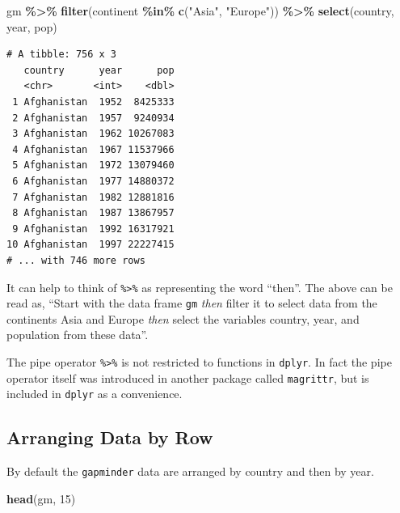\documentclass[
]{krantz}
\makeatletter
\newenvironment{Shaded}{\begin{snugshade}}{\end{snugshade}}
\newcommand{\DecValTok}[1]{\textcolor[rgb]{0.06,0.06,0.06}{#1}}
\newcommand{\KeywordTok}[1]{\textcolor[rgb]{0.27,0.27,0.27}{\textbf{#1}}}
\newcommand{\NormalTok}[1]{#1}
\newcommand{\OperatorTok}[1]{\textcolor[rgb]{0.43,0.43,0.43}{\textbf{#1}}}
\newcommand{\StringTok}[1]{\textcolor[rgb]{0.5,0.5,0.5}{#1}}
\newenvironment{kframe}{%
\medskip{}
\setlength{\fboxsep}{.8em}
 \def\at@end@of@kframe{}%
 \ifinner\ifhmode%
  \def\at@end@of@kframe{\end{minipage}}%
  \begin{minipage}{\columnwidth}%
 \fi\fi%
 \def\FrameCommand##1{\hskip\@totalleftmargin \hskip-\fboxsep
 \colorbox{shadecolor}{##1}\hskip-\fboxsep
     \hskip-\linewidth \hskip-\@totalleftmargin \hskip\columnwidth}%
 \MakeFramed {\advance\hsize-\width
   \@totalleftmargin\z@ \linewidth\hsize
   \@setminipage}}%
 {\par\unskip\endMakeFramed%
 \at@end@of@kframe}
\renewenvironment{Shaded}{\begin{kframe}}{\end{kframe}}
\makeatother
\begin{document}
\begin{Shaded}
\begin{Highlighting}[]
\NormalTok{gm }\OperatorTok{\%\textgreater{}\%}\StringTok{ }
\StringTok{  }\KeywordTok{filter}\NormalTok{(continent }\OperatorTok{\%in\%}\StringTok{ }\KeywordTok{c}\NormalTok{(}\StringTok{"Asia"}\NormalTok{, }\StringTok{"Europe"}\NormalTok{)) }\OperatorTok{\%\textgreater{}\%}\StringTok{ }
\StringTok{  }\KeywordTok{select}\NormalTok{(country, year, pop)}
\end{Highlighting}
\end{Shaded}

\begin{verbatim}
# A tibble: 756 x 3
   country      year      pop
   <chr>       <int>    <dbl>
 1 Afghanistan  1952  8425333
 2 Afghanistan  1957  9240934
 3 Afghanistan  1962 10267083
 4 Afghanistan  1967 11537966
 5 Afghanistan  1972 13079460
 6 Afghanistan  1977 14880372
 7 Afghanistan  1982 12881816
 8 Afghanistan  1987 13867957
 9 Afghanistan  1992 16317921
10 Afghanistan  1997 22227415
# ... with 746 more rows
\end{verbatim}

It can help to think of \texttt{\%\textgreater{}\%} as representing the word ``then''. The above can be read as, ``Start with the data frame \texttt{gm} \emph{then} filter it to select data from the continents Asia and Europe \emph{then} select the variables country, year, and population from these data''.

The pipe operator \texttt{\%\textgreater{}\%} is not restricted to functions in \texttt{dplyr}. In fact the pipe operator itself was introduced in another package called \texttt{magrittr}, but is included in \texttt{dplyr} as a convenience.

\hypertarget{arranging-data-by-row}{%
\subsection{Arranging Data by Row}\label{arranging-data-by-row}}

By default the \texttt{gapminder} data are arranged by country and then by year.

\begin{Shaded}
\begin{Highlighting}[]
\KeywordTok{head}\NormalTok{(gm, }\DecValTok{15}\NormalTok{)}
\end{Highlighting}
\end{Shaded}
\end{document}
